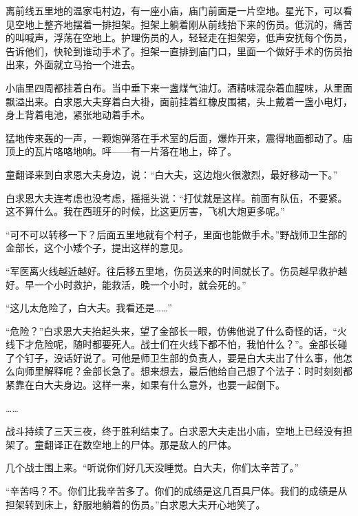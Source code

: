 \documentclass[12pt,UTF-8,openany]{ctexbook}
\begin{document}
\begin{large}
    
    离前线五里地的温家屯村边，有一座小庙，庙门前面是一片空地。星光下，可以看见空地上整齐地摆着一排担架。担架上躺着刚从前线抬下来的伤员。低沉的，痛苦的叫喊声，浮荡在空地上。护理伤员的人，轻轻走在担架旁，低声安抚每个伤员，告诉他们，快轮到谁动手术了。担架一直排到庙门口，里面一个做好手术的伤员抬出来，外面就立马抬一个进去。
    
    小庙里四周都挂着白布。当中垂下来一盏煤气油灯。酒精味混杂着血腥味，从里面飘溢出来。白求恩大夫穿着白大褂，面前挂着红橡皮围裙，头上戴着一盏小电灯，身上背着电池，紧张地动着手术。
    
    猛地传来轰的一声，一颗炮弹落在手术室的后面，爆炸开来，震得地面都动了。庙顶上的瓦片咯咯地响。呯——有一片落在地上，碎了。
    
    童翻译来到白求恩大夫身边，说：“白大夫，这边炮火很激烈，最好移动一下。”
    
    白求恩大夫连考虑也没考虑，摇摇头说：“打仗就是这样。前面有队伍，不要紧。这不算什么。我在西班牙的时候，比这更厉害，飞机大炮更多呢。”
    
    “可不可以转移一下？后面五里地就有个村子，里面也能做手术。”野战师卫生部的金部长，这个小矮个子，提出这样的意见。
    
    “军医离火线越近越好。往后移五里地，伤员送来的时间就长了。伤员越早救护越好。早一个小时救护，能救活，晚一个小时，就会死的。”
    
    “这儿太危险了，白大夫。我看还是……”
    
    “危险？”白求恩大夫抬起头来，望了金部长一眼，仿佛他说了什么奇怪的话，“火线下才危险呢，随时都要死人。战士们在火线下都不怕，我怕什么？”。金部长碰了个钉子，没话好说了。可他是师卫生部的负责人，要是白大夫出了什么事，他怎么向师里解释呢？金部长急了。想来想去，最后他给自己想了个法子：时时刻刻都紧靠在白大夫身边。这样一来，如果有什么意外，也要一起倒下。
    
    ……
    
    战斗持续了三天三夜，终于胜利结束了。白求恩大夫走出小庙，空地上已经没有担架了。童翻译正在数空地上的尸体。那是敌人的尸体。
    
    几个战士围上来。“听说你们好几天没睡觉。白大夫，你们太辛苦了。”
    
    “辛苦吗？不。你们比我辛苦多了。你们的成绩是这几百具尸体。我们的成绩是从担架转到床上，舒服地躺着的伤员。”白求恩大夫开心地笑了。
    
\end{large}


\newpage
\end{document}
